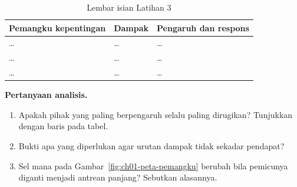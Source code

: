 \begin{table}[!htb]
  \centering\small
  \caption{Lembar isian Latihan 3}\label{tab:ch01-lat3-hasil}
  \begin{tabularx}{\textwidth}{|>{\raggedright\arraybackslash}p{}|>{\raggedright\arraybackslash}X|>{\raggedright\arraybackslash}X|}
    \hline
    \textbf{Pemangku kepentingan} & \textbf{Dampak} & \textbf{Pengaruh dan respons} \\
    \hline
    \dots & \dots & \dots \\ \hline
    \dots & \dots & \dots \\ \hline
    \dots & \dots & \dots \\ \hline
  \end{tabularx}
\end{table}

\textbf{Pertanyaan analisis.}
\begin{enumerate}
  \item Apakah pihak yang paling berpengaruh selalu paling dirugikan? Tunjukkan dengan baris
  pada tabel.
  \item Bukti apa yang diperlukan agar urutan dampak tidak sekadar pendapat?
  \item Sel mana pada Gambar~\ref{fig:ch01-peta-pemangku} berubah bila pemicunya diganti menjadi
  antrean panjang? Sebutkan alasannya.
\end{enumerate}
